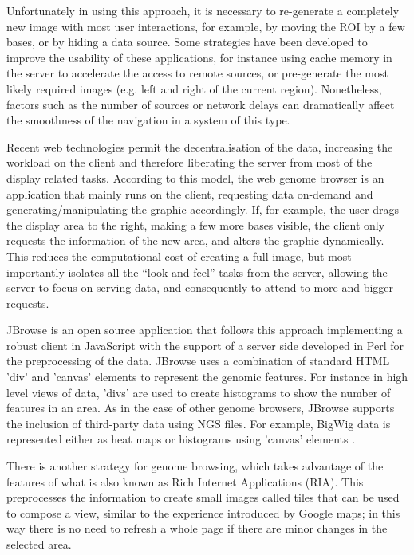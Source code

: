 Unfortunately in using this approach, it is necessary to re-generate a completely new image with most user interactions, for example, by moving the ROI by a few bases, or by hiding a data source. Some strategies have been developed to improve the usability of these applications, for instance using cache memory in the server to accelerate the access to remote sources, or pre-generate the most likely required images (e.g. left and right of the current region). Nonetheless, factors such as the number of sources or network delays can dramatically affect the smoothness of the navigation in a system of this type.

Recent web technologies permit the decentralisation of the data, increasing the workload on the client and therefore liberating the server from most of the display related tasks. According to this model, the web genome browser is an application that mainly runs on the client, requesting data on-demand and generating/manipulating the graphic accordingly. If, for example, the user drags the display area to the right, making a few more bases visible, the client only requests the information of the new area, and alters the graphic dynamically. This reduces the computational cost of creating a full image, but most importantly isolates all the ``look and feel'' tasks from the server, allowing the server to focus on serving data, and consequently to attend to more and bigger requests.

JBrowse is an open source application that follows this approach implementing a robust client in JavaScript with the support of a server side developed in Perl for the preprocessing of the data. JBrowse uses a combination of standard HTML 'div' and 'canvas' elements to represent the genomic features. For instance in high level views of data, 'divs' are used to create histograms to show the number of features in an area. As in the case of other genome browsers, JBrowse supports the inclusion of third-party data using NGS files. For example, BigWig data is represented either as heat maps or histograms using 'canvas' elements \cite{LEE2013}.

There is another strategy for genome browsing, which takes advantage of the features of what is also known as Rich Internet Applications (RIA). This preprocesses the information to create small images called tiles that can be used to compose a view, similar to the experience introduced by Google maps; in this way there is no need to refresh a whole page if there are minor changes in the selected area. 

